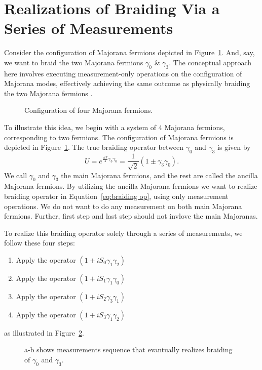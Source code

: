 \documentclass{article}
\begin{document}
\section{Realizations of Braiding Via a Series of Measurements} %
\label{sec:Realizations of Braiding Via a Series of Measurements}
Consider the configuration of Majorana fermions depicted in Figure~\ref{fig:4 mf conf}. And, say, we want to braid the two Majorana fermions $ \gamma_0 $ \& $ \gamma_3 $. The conceptual approach here involves executing measurement-only operations on the configuration of Majorana modes, effectively achieving the same outcome as physically braiding the two Majorana fermions \cite{Leijnse_2012}.
\begin{figure}
	\begin{center}
		
	\end{center}
	\caption{Configuration of four Majorana fermions.}
	\label{fig:4 mf conf}
\end{figure}
To illustrate this idea, we begin with a system of 4 Majorana fermions, corresponding to two fermions. The configuration of Majorana fermions is depicted in Figure~\ref{fig:4 mf conf}. The true braiding operator between $\gamma_0$ and $\gamma_3$ is given by
\begin{equation}
	U = e^{\frac{\pm \pi}{4} \gamma_3 \gamma_0} = \frac{1}{\sqrt{2}} (1 \pm \gamma_3 \gamma_0).
	\label{eq:braiding op}
\end{equation}
We call $ \gamma_0 $ and $ \gamma_3 $ the main Majorana fermions, and the rest are called the ancilla Majorana fermions. By utilizing the ancilla Majorana fermions we want to realize braiding operator in Equation~\ref{eq:braiding op}, using only measurement operations. We do not want to do any measurement on both main Majorana fermions. Further, first step and last step should not invlove the main Majoranas.

To realize this braiding operator solely through a series of measurements, we follow these four steps:
\begin{enumerate}
	\item Apply the operator $ (1 + iS_0 \gamma_1 \gamma_2) $
	\item Apply the operator $ (1 + iS_1 \gamma_1 \gamma_0) $
	\item Apply the operator $ (1 + iS_2 \gamma_3 \gamma_1) $
	\item Apply the operator $ (1 + iS_3 \gamma_1 \gamma_2) $
\end{enumerate}
as illustrated in Figure~\ref{fig:meas 4 mfs}.
\begin{figure}
	\begin{center}
		
	\end{center}
	\caption{a-b shows measurements sequence that evantually realizes braiding of $ \gamma_0 $ and $ \gamma_3 $.}
	\label{fig:meas 4 mfs}
\end{figure}
\end{document}
